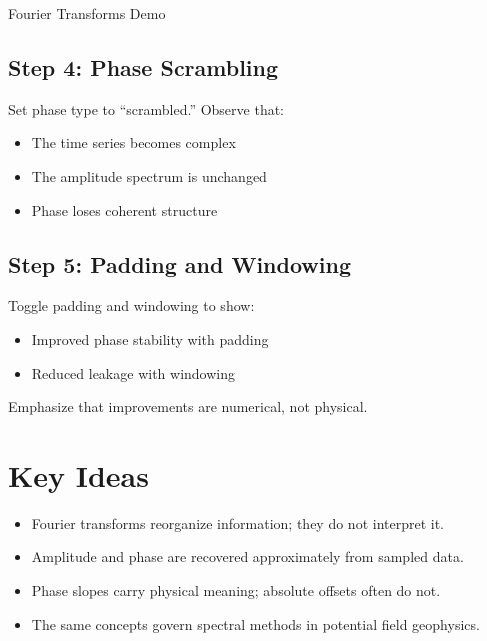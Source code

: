 \begin{activity}{Fourier Transforms Demo}
\subsection*{Step 4: Phase Scrambling}
Set phase type to ``scrambled.''
Observe that:
\begin{itemize}
  \item The time series becomes complex
  \item The amplitude spectrum is unchanged
  \item Phase loses coherent structure
\end{itemize}

\subsection*{Step 5: Padding and Windowing}
Toggle padding and windowing to show:
\begin{itemize}
  \item Improved phase stability with padding
  \item Reduced leakage with windowing
\end{itemize}

Emphasize that improvements are numerical, not physical.

\section*{Key Ideas}

\begin{itemize}
  \item Fourier transforms reorganize information; they do not interpret it.
  \item Amplitude and phase are recovered approximately from sampled data.
  \item Phase slopes carry physical meaning; absolute offsets often do not.
  \item The same concepts govern spectral methods in potential field geophysics.
\end{itemize}

\end{activity}